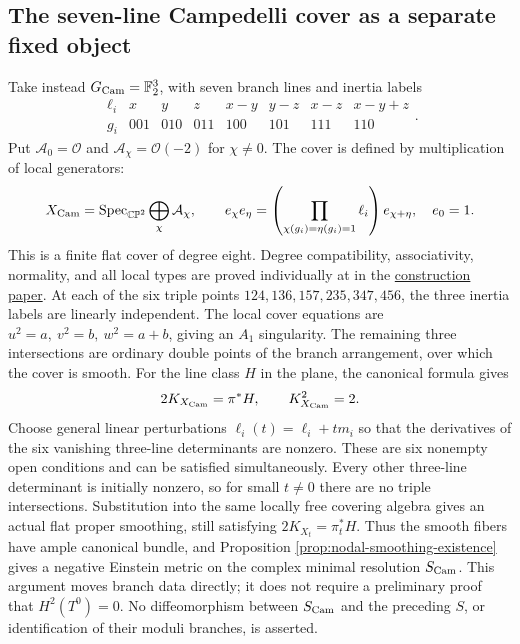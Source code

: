 \documentclass[a4paper,11pt]{article}
\numberwithin{equation}{section}
\theoremstyle{definition}
\newcommand{\CP}{\mathbb{CP}}
\begin{document}
\subsection{The seven-line Campedelli cover as a separate fixed object}\label{sec:campedelli-global-object}
Take instead $G_{\rm Cam}=\mathbb F_2^3$, with seven branch lines and inertia labels
\begin{equation}\label{eq:campedelli-global-data}
 \begin{array}{c|ccccccc}
 \ell_i&x&y&z&x-y&y-z&x-z&x-y+z\\ \hline
 g_i&001&010&011&100&101&111&110
 \end{array}.
\end{equation}
Put $\mathcal A_0=\mathcal O$ and $\mathcal A_\chi=\mathcal O(-2)$ for $\chi\ne0$.
The cover is defined by multiplication of local generators:
\begin{equation}\label{eq:campedelli-global-algebra}
 X_{\rm Cam}=\operatorname{Spec}_{\CP^2}\bigoplus_\chi\mathcal A_\chi,\qquad
 e_\chi e_\eta=
 \left(\prod_{\chi(g_i)=\eta(g_i)=1}\ell_i\right)e_{\chi+\eta},\quad e_0=1.
\end{equation}
This is a finite flat cover of degree eight.
Degree compatibility, associativity, normality, and all local types are proved individually at  in the \href{20260916_construction.tex}{construction paper}.
At each of the six triple points $124,136,157,235,347,456$, the three inertia labels are linearly independent.
The local cover equations are $u^2=a,\ v^2=b,\ w^2=a+b$, giving an $A_1$ singularity.
The remaining three intersections are ordinary double points of the branch arrangement, over which the cover is smooth.
For the line class $H$ in the plane, the canonical formula gives
\begin{equation}\label{eq:campedelli-global-canonical}
 2K_{X_{\rm Cam}}=\pi^*H,\qquad K_{X_{\rm Cam}}^2=2.
\end{equation}
Choose general linear perturbations $\ell_i(t)=\ell_i+t m_i$ so that the derivatives of the six vanishing three-line determinants are nonzero.
These are six nonempty open conditions and can be satisfied simultaneously.
Every other three-line determinant is initially nonzero, so for small $t\ne0$ there are no triple intersections.
Substitution into the same locally free covering algebra gives an actual flat proper smoothing, still satisfying $2K_{X_t}=\pi_t^*H$.
Thus the smooth fibers have ample canonical bundle, and Proposition \ref{prop:nodal-smoothing-existence} gives a negative Einstein metric on the complex minimal resolution $S_{\rm Cam}$.
This argument moves branch data directly; it does not require a preliminary proof that $H^2(T^0)=0$.
No diffeomorphism between $S_{\rm Cam}$ and the preceding $S$, or identification of their moduli branches, is asserted.
\end{document}
